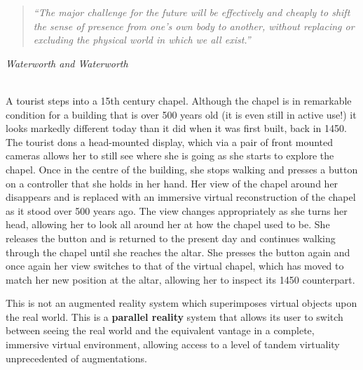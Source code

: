 \begin{quote}
	\textit{``The major challenge for the future will be effectively and cheaply to shift the sense of presence from one's own body to another, without replacing or excluding the physical world in which we all exist.''}
\end{quote}
\hfill \textit{Waterworth and Waterworth}~\cite{Waterworth2014}
\\
\\

\label{introduction}


A tourist steps into a 15th century chapel. Although the chapel is in remarkable condition for a building that is over 500 years old (it is even still in active use!) it looks markedly different today than it did when it was first built, back in 1450. The tourist dons a head-mounted display, which via a pair of front mounted cameras allows her to still see where she is going as she starts to explore the chapel. Once in the centre of the building, she stops walking and presses a button on a controller that she holds in her hand. Her view of the chapel around her disappears and is replaced with an immersive virtual reconstruction of the chapel as it stood over 500 years ago. The view changes appropriately as she turns her head, allowing her to look all around her at how the chapel used to be. She releases the button and is returned to the present day and continues walking through the chapel until she reaches the altar. She presses the button again and once again her view switches to that of the virtual chapel, which has moved to match her new position at the altar, allowing her to inspect its 1450 counterpart.

This is not an augmented reality system which superimposes virtual objects upon the real world. This is a \textbf{parallel reality} system that allows its user to switch between seeing the real world and the equivalent vantage in a complete, immersive virtual environment, allowing access to a level of tandem virtuality unprecedented of augmentations.


